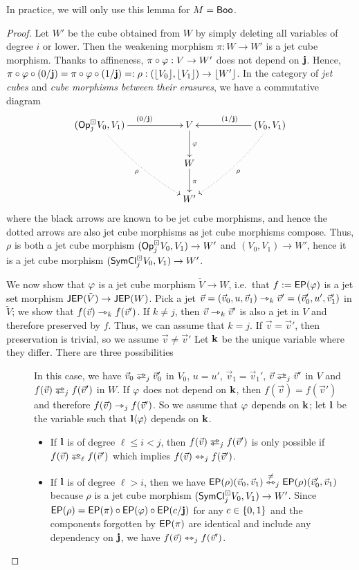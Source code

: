 \documentclass[a4paper]{memoir}
\begin{document}
In practice, we will only use this lemma for $M = \mathsf{Boo}$.
\begin{proof}
	Let $W'$ be the cube obtained from $W$ by simply deleting all variables of degree $i$ or lower.
	Then the weakening morphism $\pi : W \to W'$ is a jet cube morphism.
	Thanks to affineness, $\pi \circ \varphi : V \to W'$ does not depend on $\mathbf{j}$.
	Hence, $\pi \circ \varphi \circ (0/\mathbf{j}) = \pi \circ \varphi \circ (1/\mathbf{j}) =: \rho : (\mathopen{}\left\lfloor V_0 \right\rfloor\mathclose{}, \mathopen{}\left\lfloor V_1 \right\rfloor\mathclose{}) \to \mathopen{}\left\lfloor W' \right\rfloor\mathclose{}$.
	In the category of \emph{jet cubes} and \emph{cube morphisms between their erasures}, we have a commutative diagram
	\[
		\xymatrix{
			(\Opcube_j V_0, V_1)
				\ar@{.>}@/_/[rrdd]_{\rho}
				\ar[rr]^{(0/\dm j)}
			&&
			V
				\ar[d]^\vfi
			&&
			(V_0, V_1)
				\ar@{.>}@/^/[lldd]^{\rho}
				\ar[ll]_{(1/\dm j)}
			\\
			&& W
				\ar[d]^\pi
			\\
			&& W'
		}
	\]
	where the black arrows are known to be jet cube morphisms, and hence the dotted arrows are also jet cube morphisms as jet cube morphisms compose.
	Thus, $\rho$ is both a jet cube morphism $({\mathsf{Op}}^\boxdot_j V_0, V_1) \to W'$ and $(V_0, V_1) \to W'$, hence it is a jet cube morphism $(\mathsf{SymCl}^\boxdot_j V_0, V_1) \to W'$.
	
	We now show that $\varphi$ is a jet cube morphism $\tilde V \to W$, i.e.\ that $f := \mathsf{EP}(\varphi)$ is a jet set morphism $\mathsf{JEP}(\tilde V) \to \mathsf{JEP}(W)$.
	Pick a jet $\vec v = (\vec v_0, u, \vec v_1) \rightarrowtriangle_k \vec v' = (\vec v_0', u', \vec v_1')$ in $\tilde V$; we show that $f(\vec v) \rightarrowtriangle_k f(\vec v')$.
	If $k \neq j$, then $\vec v \rightarrowtriangle_k \vec v'$ is also a jet in $V$ and therefore preserved by $f$.
	Thus, we can assume that $k = j$.
	If $\vec v = \vec v'$, then preservation is trivial, so we assume $\vec v \neq \vec v'$
	Let $\mathbf{k}$ be the unique variable where they differ.
	There are three possibilities
	\begin{description}
		\item[]
		In this case, we have $\vec v_0 \infrajet_j \vec v_0'$ in $V_0$, $u = u'$, $\vec v_1 = \vec v_1'$, $\vec v \infrajet_j \vec v'$ in $V$ and $f(\vec v) \infrajet_j f(\vec v')$ in $W$.
		If $\varphi$ does not depend on $\mathbf{k}$, then $f(\vec v) = f(\vec v')$ and therefore $f(\vec v) \rightarrowtriangle_j f(\vec v')$.
		So we assume that $\varphi$ depends on $\mathbf{k}$; let $\mathbf{l}$ be the variable such that $\mathbf{l} \langle \varphi \rangle$ depends on $\mathbf{k}$.
		\begin{itemize}
			\item If $\mathbf{l}$ is of degree $\ell \leq i < j$, then $f(\vec v) \infrajet_j f(\vec v')$ is only possible if $f(\vec v) \infrajet_\ell f(\vec v')$ which implies $f(\vec v) \leftrightarrowtriangle_j f(\vec v')$.
			\item If $\mathbf{l}$ is of degree $\ell > i$, then we have $\mathsf{EP}(\rho)(\vec v_0, \vec v_1) \overset{\neq}{\leftrightarrowtriangle}_j \mathsf{EP}(\rho)(\vec v_0', \vec v_1)$ because $\rho$ is a jet cube morphism $(\mathsf{SymCl}^\boxdot_j V_0, V_1) \to W'$.
			Since $\mathsf{EP}(\rho) = \mathsf{EP}(\pi) \circ \mathsf{EP}(\varphi) \circ \mathsf{EP}(c/\mathbf{j})$ for any $c \in \mathopen{}\left\{ 0, 1 \right\}\mathclose{}$ and the components forgotten by $\mathsf{EP}(\pi)$ are identical and include any dependency on $\mathbf{j}$, we have $f(\vec v) \leftrightarrowtriangle_j f(\vec v')$.
		\end{itemize}
		

\end{description}
\end{proof}
\end{document}
